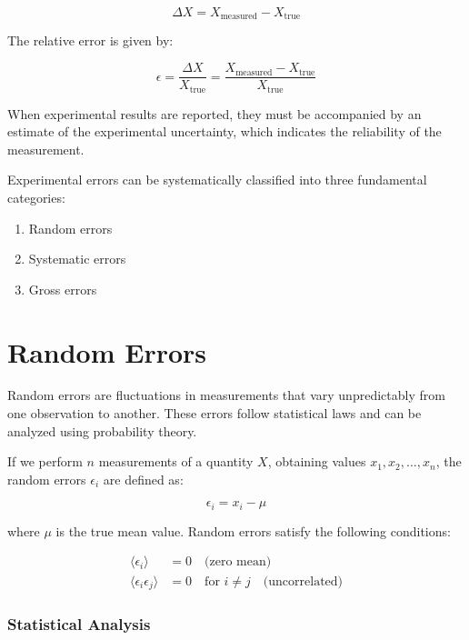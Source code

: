 \documentclass[twoside]{book}
\begin{document}
\begin{equation*}
\Delta X = X_{\text{measured}} - X_{\text{true}}
\end{equation*}

The relative error is given by:

\begin{equation*}
\epsilon = \frac{\Delta X}{X_{\text{true}}} = \frac{X_{\text{measured}} - X_{\text{true}}}{X_{\text{true}}}
\end{equation*}

When experimental results are reported, they must be accompanied by an estimate of the experimental uncertainty, which indicates the reliability of the measurement.

Experimental errors can be systematically classified into three fundamental categories:
\begin{enumerate}
\item Random errors
\item Systematic errors
\item Gross errors
\end{enumerate}

\section{Random Errors}

Random errors are fluctuations in measurements that vary unpredictably from one observation to another. These errors follow statistical laws and can be analyzed using probability theory.

If we perform $n$ measurements of a quantity $X$, obtaining values $x_1, x_2, \ldots, x_n$, the random errors $\epsilon_i$ are defined as:

\begin{equation*}
\epsilon_i = x_i - \mu
\end{equation*}

where $\mu$ is the true mean value. Random errors satisfy the following conditions:

\begin{align*}
\langle \epsilon_i \rangle &= 0 \quad \text{(zero mean)} \\
\langle \epsilon_i \epsilon_j \rangle &= 0 \quad \text{for } i \neq j \quad \text{(uncorrelated)}
\end{align*}

\subsubsection{Statistical Analysis}
\end{document}
